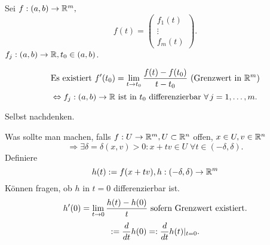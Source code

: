 \documentclass[../ana2.tex]{subfiles}
\begin{document}
\begin{lem}
    Sei \( f:(a,b)\rightarrow \mathbb{R}^m, \) 
    \[f(t) = \begin{pmatrix}
        f_1(t)\\
        \vdots \\
        f_m(t)
    \end{pmatrix}. \]
    \( f_j:(a,b)\rightarrow \mathbb{R}, t_0 \in (a,b) \).

    \[ \text{Es existiert } f'(t_0) = \lim\limits_{t\rightarrow{}t_0} \frac{f(t) - f(t_0)}{t - t_0} 
    \text{ (Grenzwert in \( \mathbb{R}^m \))} \]
    \[ \Leftrightarrow \abb{f_j}{(a,b)}{\R} 
    \text{ ist in \(t_0\) differenzierbar } \forall j=1,\ldots,m. \]
\end{lem}
\begin{bew}
    Selbst nachdenken.
\end{bew}
Was sollte man machen, falls \( f:U\rightarrow \mathbb{R}^m, 
U \subset \mathbb{R}^n \) offen, \( x\in U, v \in \mathbb{R}^n \)
\[ \Rightarrow \exists \delta = \delta(x,v) > 0: 
x + tv \in U \;\forall t \in (-\delta, \delta). \]
Definiere 
\[ h(t) := f(x + tv), h:(-\delta,\delta)\rightarrow \mathbb{R}^m \]
Können fragen, ob \( h \) in 
\( t = 0 \) differenzierbar ist.
\[ h'(0) = \lim\limits_{t\rightarrow{}0} \frac{h(t) - h(0)}{t} \text{ sofern 
Grenzwert existiert.} \]
\[ := \frac{d}{dt} h(0) =: \frac{d}{dt} h(t)\vert_{t=0}. \]
\end{document}
